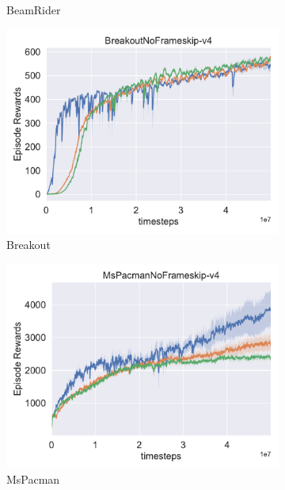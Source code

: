 \begin{figure}[h!]
\begin{subfigure}[t]{0.49\textwidth}
    \caption{BeamRider}
  \end{subfigure}\hfill
  \begin{subfigure}[t]{0.49\textwidth}
    \includegraphics[width=\textwidth]{figures/chapter5/atari_exp/breakout.pdf}
    \caption{Breakout}
  \end{subfigure}\hfill
  \begin{subfigure}[t]{0.49\textwidth}
    \includegraphics[width=\textwidth]{figures/chapter5/atari_exp/mspacman.pdf}
    \caption{MsPacman}
  \end{subfigure}\hfill
  \begin{subfigure}[t]{0.49\textwidth}

\end{subfigure}
\end{figure}
